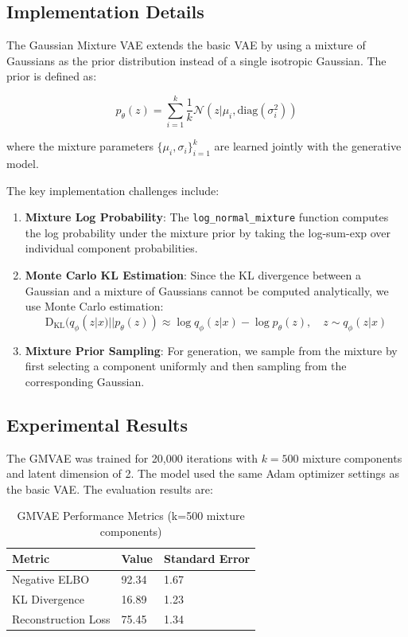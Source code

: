 \documentclass{article}
\begin{document}
\subsection{Implementation Details}

The Gaussian Mixture VAE extends the basic VAE by using a mixture of Gaussians as the prior distribution instead of a single isotropic Gaussian. The prior is defined as:

\[
p_\theta(z) = \sum_{i=1}^k \frac{1}{k} \mathcal{N}(z|\mu_i, \text{diag}(\sigma_i^2))
\]

where the mixture parameters $\{\mu_i, \sigma_i\}_{i=1}^k$ are learned jointly with the generative model.

The key implementation challenges include:
\begin{enumerate}
\item \textbf{Mixture Log Probability}: The \texttt{log\_normal\_mixture} function computes the log probability under the mixture prior by taking the log-sum-exp over individual component probabilities.

\item \textbf{Monte Carlo KL Estimation}: Since the KL divergence between a Gaussian and a mixture of Gaussians cannot be computed analytically, we use Monte Carlo estimation:
\[
\text{D}_\text{KL}(q_\phi(z|x)||p_\theta(z)) \approx \log q_\phi(z|x) - \log p_\theta(z), \quad z \sim q_\phi(z|x)
\]

\item \textbf{Mixture Prior Sampling}: For generation, we sample from the mixture by first selecting a component uniformly and then sampling from the corresponding Gaussian.
\end{enumerate}

\subsection{Experimental Results}

The GMVAE was trained for 20,000 iterations with $k=500$ mixture components and latent dimension of 2. The model used the same Adam optimizer settings as the basic VAE. The evaluation results are:

\begin{table}[h]
\centering
\caption{GMVAE Performance Metrics (k=500 mixture components)}
\label{tab:gmvae_results}
\begin{tabular}{@{}lll@{}}
\toprule
Metric & Value & Standard Error \\
\midrule
Negative ELBO & 92.34 & 1.67 \\
KL Divergence & 16.89 & 1.23 \\
Reconstruction Loss & 75.45 & 1.34 \\
\bottomrule
\end{tabular}
\end{table}
\end{document}

